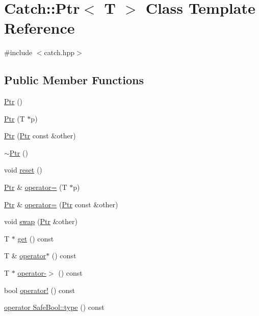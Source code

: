 \hypertarget{classCatch_1_1Ptr}{\section{Catch\-:\-:Ptr$<$ T $>$ Class Template Reference}
\label{classCatch_1_1Ptr}
}


{\ttfamily \#include $<$catch.\-hpp$>$}

\subsection*{Public Member Functions}
\begin{DoxyCompactItemize}
\item 
\hyperlink{classCatch_1_1Ptr_a6108f0195595ee9d7a411daea810beaf}{Ptr} ()
\item 
\hyperlink{classCatch_1_1Ptr_aacec063a79cd142e39040a31c6b3c40b}{Ptr} (T $\ast$p)
\item 
\hyperlink{classCatch_1_1Ptr_ac629dd8ebe5763a37bb89e6c1d6a1771}{Ptr} (\hyperlink{classCatch_1_1Ptr}{Ptr} const \&other)
\item 
\hyperlink{classCatch_1_1Ptr_ac96d3bb33adcfb983207385cfba5fe8a}{$\sim$\-Ptr} ()
\item 
void \hyperlink{classCatch_1_1Ptr_af8d0fa7a2cd20842830b354ac31dfe5c}{reset} ()
\item 
\hyperlink{classCatch_1_1Ptr}{Ptr} \& \hyperlink{classCatch_1_1Ptr_a9b08c868b447d679ed201921f5c94683}{operator=} (T $\ast$p)
\item 
\hyperlink{classCatch_1_1Ptr}{Ptr} \& \hyperlink{classCatch_1_1Ptr_af42074444c1bc6a70ebdc406a8617708}{operator=} (\hyperlink{classCatch_1_1Ptr}{Ptr} const \&other)
\item 
void \hyperlink{classCatch_1_1Ptr_a172bf8b4e71e26a5a4d92f5b02158b50}{swap} (\hyperlink{classCatch_1_1Ptr}{Ptr} \&other)
\item 
T $\ast$ \hyperlink{classCatch_1_1Ptr_a1617aa5ff058b53ea572cf965617b7ae}{get} () const 
\item 
T \& \hyperlink{classCatch_1_1Ptr_a3a4c139032a8bd1bffa553103d5dbfd3}{operator$\ast$} () const 
\item 
T $\ast$ \hyperlink{classCatch_1_1Ptr_afaa13250d5e0ae5a440726d5e5aa7295}{operator-\/$>$} () const 
\item 
bool \hyperlink{classCatch_1_1Ptr_aea1a99ded6d62423ccb9173fab91b56e}{operator!} () const 
\item 
\hyperlink{classCatch_1_1Ptr_a27234c04feec43ffe0fd08e045557448}{operator Safe\-Bool\-::type} () const 
\end{DoxyCompactItemize}


